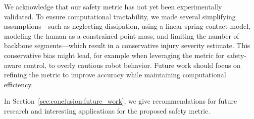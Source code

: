 We acknowledge that our safety metric has not yet been experimentally validated. To ensure computational tractability, we made several simplifying assumptions—such as neglecting dissipation, using a linear spring contact model, modeling the human as a constrained point mass, and limiting the number of backbone segments—which result in a conservative injury severity estimate. This conservative bias might lead, for example when leveraging the metric for safety-aware control, to overly cautious robot behavior. Future work should focus on refining the metric to improve accuracy while maintaining computational efficiency.

In Section~\ref{sec:conclusion:future_work}, we give recommendations for future research and interesting applications for the proposed safety metric.

